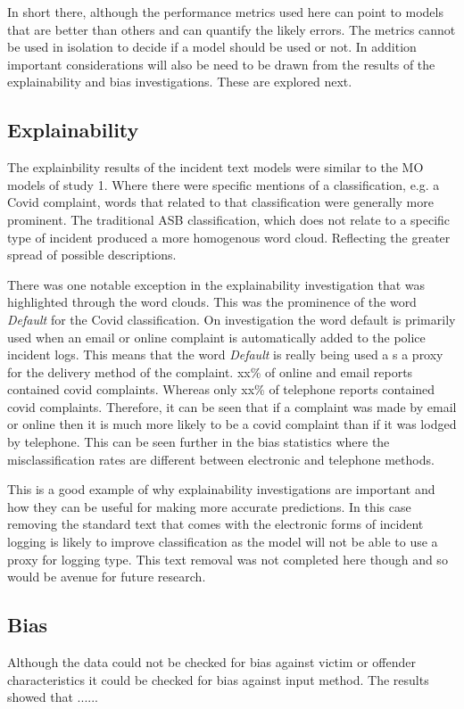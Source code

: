  In short there, although the performance metrics used here can point to models that are better than others and can quantify the likely errors. The metrics cannot be used in isolation to decide if a model should be used or not. In addition important considerations will also be need to be drawn from the results of the explainability and bias investigations. These are explored next.


\subsection{Explainability} The explainbility results of the incident text models were similar to the MO models of study 1. Where there were specific mentions of a classification, e.g. a Covid complaint,  words that related to that classification were generally more prominent. The traditional ASB classification, which does not relate to a specific type of incident produced a more homogenous word cloud. Reflecting the greater spread of possible descriptions. 

There was one notable exception in the explainability investigation that was highlighted through the word clouds. This was the prominence of the word \emph{Default} for the Covid classification. On investigation the word default is primarily used when an email or online complaint is automatically added to the police incident logs. This means that the word \emph{Default} is really being used a s a proxy for the delivery method of the complaint.  xx\% of online and email reports contained covid complaints.  Whereas only xx\% of  telephone reports contained covid complaints. Therefore, it can be seen that if a complaint was made by email or online then it is much more likely to be a covid complaint than if it was lodged by telephone.   This can be seen further in the bias statistics where the misclassification rates are different between electronic and telephone methods. 

This is a good example of why explainability investigations are important and how they can be useful for making more accurate predictions. In this case removing the standard text that comes with the electronic forms of incident logging is likely to improve classification as the model will not be able to use a proxy for logging type. This text removal was not completed here though and so would be avenue for future research.

 

\subsection{Bias}Although the data could not be checked for bias against victim or offender characteristics it could be checked for bias against input method. The results showed that ......

